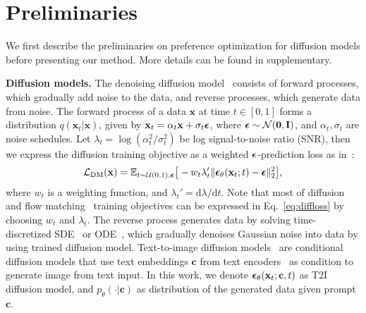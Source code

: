 \section{Preliminaries}
\label{sec:prelim}
We first describe the preliminaries on preference optimization for diffusion models before presenting our method. 
More details can be found in supplementary.

\vspace{1mm}
\noindent
{\bf Diffusion models.}
The denoising diffusion model~\citep{sohl2015deep, song2019generative, ho2020denoising, song2020score}  consists of forward processes, which gradually add noise to the data, and reverse processes, which generate data from noise. 
The forward process of a data $\mathbf{x}$ at time $t\in[0,1]$ forms a distribution $q(\mathbf{x}_t|\mathbf{x})$, given by $\mathbf{x}_t=\alpha_t\mathbf{x}+\sigma_t\boldsymbol{\epsilon}$, where $\boldsymbol{\epsilon}\sim\mathcal{N}(\boldsymbol{0},\mathbf{I})$, and $\alpha_t, \sigma_t$ are noise schedules. 
Let $\lambda_t = \log (\alpha_t^2 / \sigma_t^2)$ be log signal-to-noise ratio (SNR), then 
we express the diffusion training objective as a weighted $\boldsymbol{\epsilon}$-prediction loss as in~\citep{kingma2023understanding}:
\begin{equation}
\label{eq:diffloss}
    \mathcal{L}_{\textrm{DM}}(\mathbf{x}) = \mathbb{E}_{t\sim\mathcal{U}(0,1),\boldsymbol{\epsilon}}\big[-w_t \lambda_t' \|\boldsymbol{\epsilon}_\theta(\mathbf{x}_t;t)-\boldsymbol{\epsilon}\|_2^2\big]\text{,} 
\end{equation}
where $w_t$ is a weighting function, and $\lambda_t' = \mathrm{d}\lambda / \mathrm{d}t$.
Note that most of diffusion~\citep{karras2022elucidating} and flow matching~\citep{lipman2022flow} training objectives can be expressed in Eq.~\eqref{eq:diffloss} by choosing $w_t$ and $\lambda_t$.
The reverse process generates data by solving time-discretized SDE~\citep{song2020score} or ODE~\citep{song2020denoising, karras2022elucidating}, which gradually denoises Gaussian noise into data by using trained diffusion model.
Text-to-image diffusion models~\citep{nichol2021glide, ramesh2021zero, ramesh2022hierarchical, saharia2022photorealistic, rombach2022high} are conditional diffusion models that use text embeddings $\mathbf{c}$ from text encoders~\citep{radford2021learning, raffel2020exploring} as condition to generate image from text input. 
In this work, we denote $\boldsymbol{\epsilon}_\theta(\mathbf{x}_t;\mathbf{c},t)$ as T2I diffusion model, and $p_\theta(\cdot|\mathbf{c})$ as distribution of the generated data given prompt $\mathbf{c}$. 

